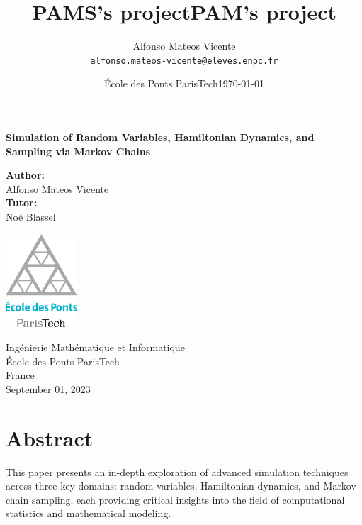 \documentclass{report}
\title{PAMS's project} %
\author{Alfonso Mateos Vicente\\ \texttt{alfonso.mateos-vicente@eleves.enpc.fr}} %
\date{École des Ponts ParisTech} %
\title{PAM's project}
\date{\today}
\begin{document}
\begin{titlepage}
    \begin{center}
        \vspace*{1cm}
        
        \Huge
        \textbf{Simulation of Random Variables, Hamiltonian Dynamics, and Sampling via Markov Chains}
        
        \vspace{1.5cm}

        \Large
        \textbf{Author:} \\
        \vspace{0.25cm}
        \LARGE
        Alfonso Mateos Vicente \\
        \vspace{0.5cm}
        \Large
        \textbf{Tutor:} \\
        \vspace{0.25cm}
        \LARGE
        Noé Blassel

        \vfill
        
        \includegraphics[width=0.2\textwidth]{./logo-enpc.eps}
        
        \vspace{1cm}
        
        \normalsize
        Ingénierie Mathématique et Informatique \\
        École des Ponts ParisTech \\
        France \\
        September 01, 2023
    \end{center}
    \restoregeometry
\end{titlepage}


\newpage
\tableofcontents
\newpage

\section*{Abstract}

This paper presents an in-depth exploration of advanced simulation techniques across three key domains: random variables, Hamiltonian dynamics, and Markov chain sampling, each providing critical insights into the field of computational statistics and mathematical modeling.
\end{document}
